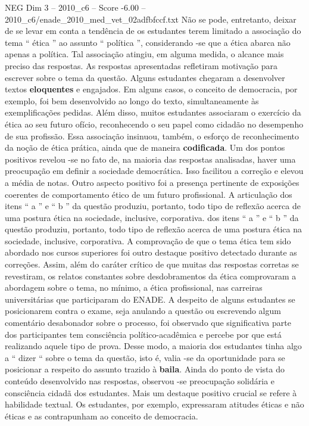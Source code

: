 \begin{textsample}{NEG Dim 3 – 2010\_c6 – Score -6.00 – 2010\_c6/enade\_2010\_med\_vet\_02adfbfccf.txt}
Não se pode, entretanto, deixar de se levar em conta a tendência de os estudantes terem limitado a associação do tema “ ética ” ao assunto “ política ”, considerando -se que a ética abarca não apenas a política.
Tal associação atingiu, em alguma medida, o alcance mais preciso das respostas.
As respostas apresentadas refletiram motivação para escrever sobre o tema da questão.
Alguns estudantes chegaram a desenvolver textos \textbf{eloquentes} e engajados.
Em alguns casos, o conceito de democracia, por exemplo, foi bem desenvolvido ao longo do texto, simultaneamente às exemplificações pedidas.
Além disso, muitos estudantes associaram o exercício da ética ao seu futuro ofício, reconhecendo o seu papel como cidadão no desempenho de sua profissão.
Essa associação insinuou, também, o esforço de reconhecimento da noção de ética prática, ainda que de maneira \textbf{codificada}.
Um dos pontos positivos revelou -se no fato de, na maioria das respostas analisadas, haver uma preocupação em definir a sociedade democrática.
Isso facilitou a correção e elevou a média de notas.
Outro aspecto positivo foi a presença pertinente de exposições coerentes de comportamento ético de um futuro profissional.
A articulação dos itens “ a ” e “ b ” da questão produziu, portanto, todo tipo de reflexão acerca de uma postura ética na sociedade, inclusive, corporativa. dos itens “ a ” e “ b ” da questão produziu, portanto, todo tipo de reflexão acerca de uma postura ética na sociedade, inclusive, corporativa.
A comprovação de que o tema ética tem sido abordado nos cursos superiores foi outro destaque positivo detectado durante as correções.
Assim, além do caráter crítico de que muitas das respostas corretas se revestiram, os relatos constantes sobre desdobramentos da ética comprovaram a abordagem sobre o tema, no mínimo, a ética profissional, nas carreiras universitárias que participaram do ENADE.
A despeito de alguns estudantes se posicionarem contra o exame, seja anulando a questão ou escrevendo algum comentário desabonador sobre o processo, foi observado que significativa parte dos participantes tem consciência político-acadêmica e percebe por que está realizando aquele tipo de prova.
Desse modo, a maioria dos estudantes tinha algo a “ dizer “ sobre o tema da questão, isto é, valia -se da oportunidade para se posicionar a respeito do assunto trazido à \textbf{baila}.
Ainda do ponto de vista do conteúdo desenvolvido nas respostas, observou -se preocupação solidária e consciência cidadã dos estudantes.
Mais um destaque positivo crucial se refere à habilidade textual.
Os estudantes, por exemplo, expressaram atitudes éticas e não éticas e as contrapunham ao conceito de democracia.

\end{textsample}
